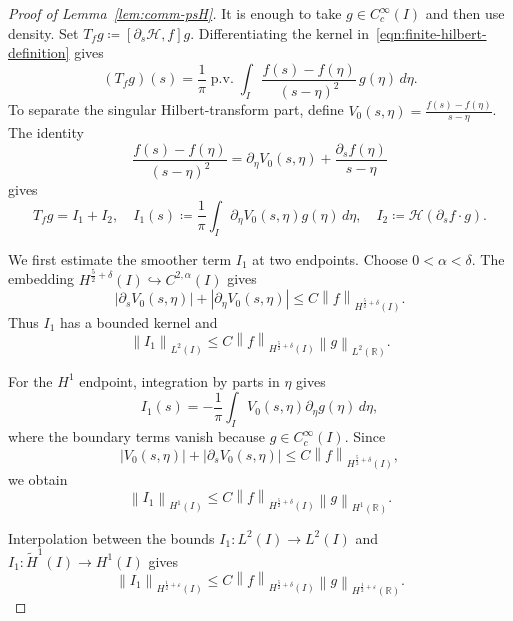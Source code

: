 \documentclass[11pt,reqno]{amsart}
\theoremstyle{plain}
\theoremstyle{definition}
\numberwithin{equation}{section}
\newcommand{\p}{\partial}
\newcommand{\mc}[1]{\mathcal{#1}}
\newcommand{\wt}[1]{\widetilde{#1}}
\newcommand{\abs}[1]{\left\lvert #1 \right\rvert}
\newcommand{\norm}[1]{\left\lVert #1 \right\rVert}
\newcommand{\R}{\mathbb{R}}
\newcommand{\hi}[1]{H^{#1}(I)}
\newcommand{\thi}[1]{\wt H^{#1}(I)}
\newcommand{\hr}[1]{H^{#1}(\R)}
\begin{document}
\begin{proof}[Proof of Lemma~\ref{lem:comm-psH}]
It is enough to take $g\in C_c^\infty(I)$ and then use density. Set
$T_fg\coloneqq[\p_s\mc H,f]g$. Differentiating the kernel in~\eqref{eqn:finite-hilbert-definition} gives
\begin{equation}\label{eq:comm-kernel}
    (T_fg)(s)
    =\frac{1}{\pi}\operatorname{p.v.}\int_I
    \frac{f(s)-f(\eta)}{(s-\eta)^2}\,g(\eta)\,d\eta.
\end{equation}
To separate the singular Hilbert-transform part, define
$V_0(s,\eta)=\frac{f(s)-f(\eta)}{s-\eta}$. The identity
\begin{equation}\label{eq:kernel-decomp}
    \frac{f(s)-f(\eta)}{(s-\eta)^2}
    =\p_\eta V_0(s,\eta)+\frac{\p_s f(\eta)}{s-\eta}
\end{equation}
gives
\begin{equation}\label{eq:comm-split}
    T_fg=I_1+I_2, \quad I_1(s)\coloneqq\frac{1}{\pi}\int_I \p_\eta V_0(s,\eta)g(\eta)\,d\eta, \quad
    I_2\coloneqq\mc H(\p_s f\cdot g).
\end{equation}

We first estimate the smoother term $I_1$ at two endpoints. Choose
$0<\alpha<\delta$. The embedding
$H^{\frac52+\delta}(I)\hookrightarrow C^{2,\alpha}(I)$ gives
\begin{equation}
    \abs{\p_sV_0(s,\eta)}+\abs{\p_\eta V_0(s,\eta)}
    \le C\norm{f}_{H^{\frac52+\delta}(I)}.
\end{equation}
Thus $I_1$ has a bounded kernel and
\begin{equation}
    \norm{I_1}_{L^2(I)}
    \le C\norm{f}_{H^{\frac52+\delta}(I)}\norm{g}_{L^2(\R)}.
\end{equation}

For the $H^1$ endpoint, integration by parts in $\eta$ gives
\begin{equation}
    I_1(s)=-\frac{1}{\pi}\int_I
    V_0(s,\eta)\p_\eta g(\eta)\,d\eta,
\end{equation}
where the boundary terms vanish because $g\in C_c^\infty(I)$. Since
\begin{equation}
    \abs{V_0(s,\eta)}+\abs{\p_sV_0(s,\eta)}
    \le C\norm{f}_{H^{\frac52+\delta}(I)},
\end{equation}
we obtain
\begin{equation}
    \norm{I_1}_{H^1(I)}
    \le C\norm{f}_{H^{\frac52+\delta}(I)}\norm{g}_{H^1(\R)}.
\end{equation}

Interpolation between the bounds
$I_1:L^2(I)\to L^2(I)$ and $I_1:\thi{1}\to H^1(I)$ gives
\begin{equation}\label{eqn:commutator-smooth-bound}
    \norm{I_1}_{\hi{\frac12+\varepsilon}}
    \le C\norm{f}_{H^{\frac52+\delta}(I)}
    \norm{g}_{\hr{\frac12+\varepsilon}}.
\end{equation}


\end{proof}
\end{document}
